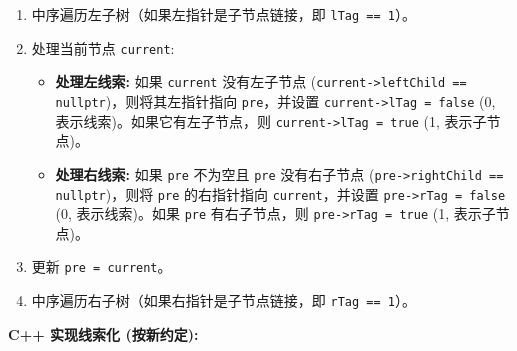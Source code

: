 \begin{enumerate}
	\item 中序遍历左子树（如果左指针是子节点链接，即 \lstinline{lTag == 1}）。
	\item 处理当前节点 \lstinline{current}:
	\begin{itemize}
		\item \textbf{处理左线索:} 如果 \lstinline{current} 没有左子节点 (\lstinline{current->leftChild == nullptr})，则将其左指针指向 \lstinline{pre}，并设置 \lstinline{current->lTag = false} (0, 表示线索)。如果它有左子节点，则 \lstinline{current->lTag = true} (1, 表示子节点)。
		\item \textbf{处理右线索:} 如果 \lstinline{pre} 不为空且 \lstinline{pre} 没有右子节点 (\lstinline{pre->rightChild == nullptr})，则将 \lstinline{pre} 的右指针指向 \lstinline{current}，并设置 \lstinline{pre->rTag = false} (0, 表示线索)。如果 \lstinline{pre} 有右子节点，则 \lstinline{pre->rTag = true} (1, 表示子节点)。
	\end{itemize}
	\item 更新 \lstinline{pre = current}。
	\item 中序遍历右子树（如果右指针是子节点链接，即 \lstinline{rTag == 1}）。
\end{enumerate}

\textbf{C++ 实现线索化 (按新约定):}

